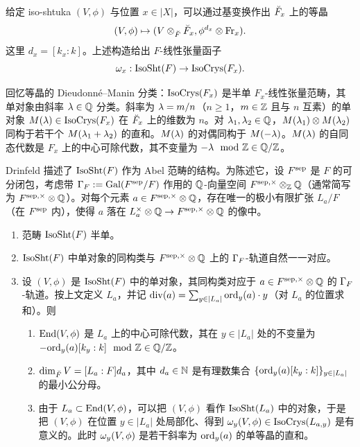 给定 iso-shtuka $(V,\phi)$ 与位置 $x\in|X|$，可以通过基变换作出 $\breve F_{x}$ 上的等晶
\begin{equation*}
(V,\phi)\mapsto (V\otimes_{\breve F}\breve F_{x}, \phi^{d_{x}}\otimes \textup{Fr}_{x}).
\end{equation*}
这里 $d_{x}=[k_{x}:k]$。上述构造给出 $F$-线性张量函子
\begin{equation}\label{Sht fib functor}
\omega_{x}: \mathrm{IsoSht}(F)\to \mathrm{IsoCrys}(F_{x}).
\end{equation}

回忆等晶的 Dieudonné–Manin 分类：$\mathrm{IsoCrys}(F_{x})$ 是半单 $F_{x}$-线性张量范畴，其单对象由斜率 $\lambda\in \mathbb{Q}$ 分类。斜率为 $\lambda=m/n$（$n\ge1$，$m\in \mathbb{Z}$ 且与 $n$ 互素）的单对象 $M(\lambda)\in \mathrm{IsoCrys}(F_{x})$ 在 $\breve F_{x}$ 上的维数为 $n$。对 $\lambda_{1}, \lambda_{2}\in \mathbb{Q}$，$M(\lambda_{1})\otimes M(\lambda_{2})$ 同构于若干个 $M(\lambda_{1}+\lambda_{2})$ 的直和。$M(\lambda)$ 的对偶同构于 $M(-\lambda)$。$M(\lambda)$ 的自同态代数是 $F_{x}$ 上的中心可除代数，其不变量为 $-\lambda\mod{\mathbb{Z}}\in \mathbb{Q}/\mathbb{Z}$。

Drinfeld \cite[\S2]{Dr-Pet} 描述了 $\mathrm{IsoSht}(F)$ 作为 Abel 范畴的结构。为陈述它，设 $F^{\mathrm{sep}}$ 是 $F$ 的可分闭包，考虑带 $\Gamma_{F}:=\textup{Gal}(F^{\mathrm{sep}}/F)$ 作用的 $\mathbb{Q}$-向量空间 $F^{\mathrm{sep},\times}\otimes_{\mathbb{Z}}\mathbb{Q}$（通常简写为 $F^{\mathrm{sep},\times}\otimes\mathbb{Q}$）。对每个元素 $a\in F^{\mathrm{sep},\times}\otimes\mathbb{Q}$，存在唯一的极小有限扩张 $L_{a}/F$（在 $F^{\mathrm{sep}}$ 内），使得 $a$ 落在 $L^{\times}_{a}\otimes\mathbb{Q}\to F^{\mathrm{sep},\times}\otimes\mathbb{Q}$ 的像中。

\begin{thm}\label{th:isoSht}
\begin{enumerate}
\item 范畴 $\mathrm{IsoSht}(F)$ 半单。
\item $\mathrm{IsoSht}(F)$ 中单对象的同构类与 $F^{\mathrm{sep},\times}\otimes\mathbb{Q}$ 上的 $\Gamma_{F}$-轨道自然一一对应。
\item 设 $(V,\phi)$ 是 $\mathrm{IsoSht}(F)$ 中的单对象，其同构类对应于 $a\in F^{\mathrm{sep},\times}\otimes\mathbb{Q}$ 的 $\Gamma_{F}$-轨道。按上文定义 $L_{a}$，并记 $\mathrm{div}(a)=\sum_{y\in |L_{a}|}\mathrm{ord}_{y}(a)\cdot y$（对 $L_{a}$ 的位置求和）。则
\begin{enumerate}
\item $\textup{End}(V,\phi)$ 是 $L_{a}$ 上的中心可除代数，其在 $y\in |L_{a}|$ 处的不变量为 $-\mathrm{ord}_{y}(a)[k_{y}:k]\mod {\mathbb{Z}}\in \mathbb{Q}/\mathbb{Z}$。
\item $\dim_{\breve F}V=[L_{a}:F]d_{a}$，其中 $d_{a}\in \mathbb{N}$ 是有理数集合 $\{\mathrm{ord}_{y}(a)[k_{y}:k]\}_{y\in |L_{a}|}$ 的最小公分母。
\item 由于 $L_{a}\subset \textup{End}(V,\phi)$，可以把 $(V,\phi)$ 看作 $\mathrm{IsoSht}(L_{a})$ 中的对象，于是把 $(V,\phi)$ 在位置 $y\in |L_{a}|$ 处局部化、得到 $\omega_{y}(V,\phi)\in \mathrm{IsoCrys}(L_{a,y})$ 是有意义的。此时 $\omega_{y}(V,\phi)$ 是若干斜率为 $\mathrm{ord}_{y}(a)$ 的单等晶的直和。
\end{enumerate}

\end{enumerate}
\end{thm}

